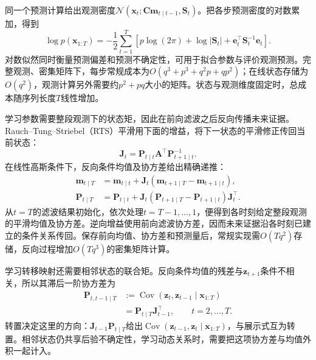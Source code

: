 同一个预测计算给出观测密度$\mathcal N(\bm{x}_t;\bm{C}\bm{m}_{t\mid t-1},\bm{S}_t)$。把各步预测密度的对数累加，得到
\begin{equation}
  \log p(\bm{x}_{1:T})
    =-\frac12\sum_{t=1}^{T}
      \left[
        p\log(2\pi)+\log|\bm{S}_t|
        +\bm{e}_t^\top\bm{S}_t^{-1}\bm{e}_t
      \right].
  \label{eq:pgm-dynamic-kalman-likelihood}
\end{equation}
对数似然同时衡量预测偏差和预测不确定性，可用于拟合参数与评价观测预测。完整观测、密集矩阵下，每步常规成本为$O(q^3+p^3+q^2p+qp^2)$；在线状态存储为$O(q^2)$，观测计算另外需要约$p^2+pq$大小的矩阵。状态与观测维度固定时，总成本随序列长度$T$线性增加。

学习参数需要整段观测下的状态矩，因此在前向滤波之后反向传播未来证据。Rauch--Tung--Striebel（RTS）平滑用下面的增益，将下一状态的平滑修正传回当前状态：
\[
  \bm{J}_t=\bm{P}_{t\mid t}\bm{A}^{\top}
    \bm{P}_{t+1\mid t}^{-1}.
\]
在线性高斯条件下，反向条件均值及协方差给出精确递推：
\begin{equation}
  \begin{aligned}
    \bm{m}_{t\mid T}
      &=\bm{m}_{t\mid t}
        +\bm{J}_t(\bm{m}_{t+1\mid T}
          -\bm{m}_{t+1\mid t}),\\
    \bm{P}_{t\mid T}
      &=\bm{P}_{t\mid t}
        +\bm{J}_t(\bm{P}_{t+1\mid T}
          -\bm{P}_{t+1\mid t})\bm{J}_t^\top.
  \end{aligned}
  \label{eq:pgm-dynamic-rts}
\end{equation}
从$t=T$的滤波结果初始化，依次处理$t=T-1,\ldots,1$，便得到各时刻给定整段观测的平滑均值及协方差。逆向增益使用前向滤波协方差，因而未来证据沿各时刻已建立的条件关系传回。保存前向均值、协方差和预测量后，常规实现需$O(Tq^2)$存储，反向过程增加$O(Tq^3)$的密集矩阵计算。

学习转移映射还需要相邻状态的联合矩。反向条件均值的残差与$\bm{z}_{t+1}$条件不相关，所以其滞后一阶协方差为
\begin{equation}
  \begin{aligned}
    \bm{P}_{t,t-1\mid T}
      &:=\operatorname{Cov}(\bm{z}_t,\bm{z}_{t-1}
        \mid\bm{x}_{1:T})\\
      &=\bm{P}_{t\mid T}\bm{J}_{t-1}^{\top},
      \qquad t=2,\ldots,T.
  \end{aligned}
  \label{eq:pgm-dynamic-lag-covariance}
\end{equation}
转置决定这里的方向：$\bm{J}_{t-1}\bm{P}_{t\mid T}$给出$\operatorname{Cov}(\bm{z}_{t-1},\bm{z}_{t}\mid\bm{x}_{1:T})$，与展示式互为转置。相邻状态仍共享后验不确定性，学习动态关系时，需要把这项协方差与均值外积一起计入。

